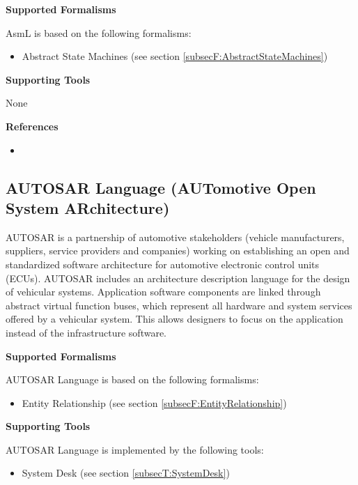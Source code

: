 \textbf{Supported Formalisms}

AsmL is based on the following formalisms:
\begin{itemize}
	\item Abstract State Machines (see section \ref{subsecF:AbstractStateMachines})
\end{itemize}


\textbf{Supporting Tools}

None


\textbf{References}
\begin{itemize}
	
\item {}
\end{itemize}



\subsection{AUTOSAR Language (AUTomotive Open System ARchitecture)}
\label{subsecL:AUTOSARLanguage}


AUTOSAR is a partnership of automotive stakeholders (vehicle manufacturers, suppliers, service providers and companies) working on establishing an open and standardized software architecture for automotive electronic control units (ECUs). AUTOSAR includes an architecture description language for the design of vehicular systems. Application software components are linked through abstract virtual function buses, which represent all hardware and system services offered by a vehicular system. This allows designers to focus on the application instead of the infrastructure software.

\textbf{Supported Formalisms}

AUTOSAR Language is based on the following formalisms:
\begin{itemize}
	\item Entity Relationship (see section \ref{subsecF:EntityRelationship})
\end{itemize}


\textbf{Supporting Tools}

AUTOSAR Language is implemented by the following tools:
\begin{itemize}
	\item System Desk (see section \ref{subsecT:SystemDesk})
\end{itemize}



